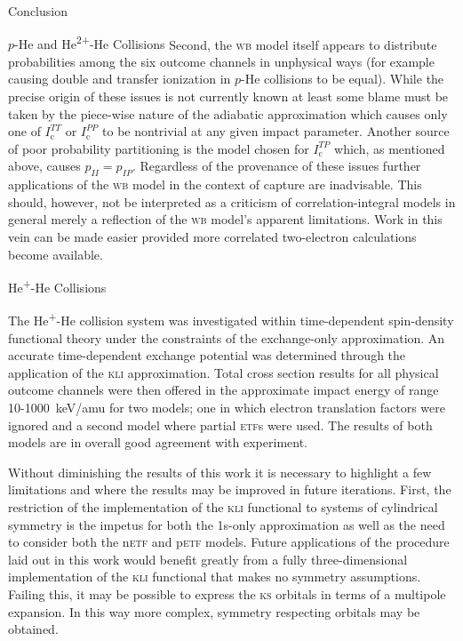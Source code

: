 \documentclass[letterpaper, 11 pt]{report}
\begin{document}
\begin{chapter}{Conclusion \label{chap:con}}
\begin{section}{\texorpdfstring{$p$}{p}-He and \texorpdfstring{He\textsuperscript{2+}}{He2+}-He
                   Collisions \label{sec:con-phe2p-he}}
      Second, the \textsc{wb} model itself appears to distribute probabilities among the six outcome
      channels in unphysical ways (for example causing double and transfer ionization in $p$-He
      collisions to be equal). While the precise origin of these issues is not currently known at least
      some blame must be taken by the piece-wise nature of the adiabatic approximation which causes only
      one of $I^{TT}_\mathrm{c}$ or $I^{PP}_\mathrm{c}$ to be nontrivial at any given impact parameter.
      Another source of poor probability partitioning is the model chosen for $I^{TP}_\mathrm{c}$ which,
      as mentioned above, causes $p_{II} = p_{IP}$. Regardless of the provenance of these issues further
      applications of the \textsc{wb} model in the context of capture are inadvisable. This should,
      however, not be interpreted as a criticism of correlation-integral models in general merely a
      reflection of the \textsc{wb} model's apparent limitations. Work in this vein can be made easier
      provided more correlated two-electron calculations become available.

   \end{section}

   \begin{section}{\texorpdfstring{He\textsuperscript{+}}{He+}-He Collisions \label{sec:con-hephe}}

      The He\textsuperscript{+}-He collision system was investigated within  time-dependent spin-density
      functional theory under the constraints of the exchange-only approximation. An accurate
      time-dependent exchange potential was determined through the application of the \textsc{kli}
      approximation. Total cross section results for all physical outcome channels were then offered in
      the approximate impact energy of range 10-1000~keV/amu for two models; one in which electron
      translation factors were ignored and a second model where partial \textsc{etf}s
      were used. The results of both models are in overall good agreement with experiment.

      Without diminishing the results of this work it is necessary to highlight a few limitations and
      where the results may be improved in future iterations. First, the restriction of the
      implementation of the \textsc{kli} functional to systems of cylindrical symmetry is the impetus
      for both the 1s-only approximation as well as the need to consider both the n\textsc{etf} and
      p\textsc{etf} models. Future applications of the procedure laid out in this work would benefit
      greatly from a fully three-dimensional implementation of the \textsc{kli} functional that makes no
      symmetry assumptions. Failing this, it may be possible to express the \textsc{ks} orbitals in
      terms of a multipole expansion. In this way more complex, symmetry respecting orbitals may be
      obtained.


\end{section}
\end{chapter}
\end{document}
